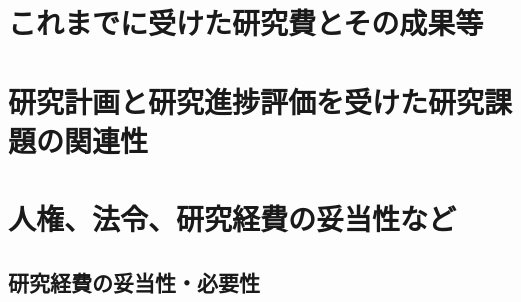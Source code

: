 \documentclass[11pt,a4paper,twoside]{jarticle}
\newcommand{\研究種別}{A}	%
\newcommand{\研究課題名}{コ・クリエイティブなソフトウェア開発者を育成するPBL型教育}
\newcommand{\研究機関名}{産業技術大学院大学}
\newcommand{\研究代表者氏名}{中鉢　欣秀}
\newcommand{\研究代表者氏名ふりがな}{ちゅうばち　よしひで}
\newcommand{\本応募effort}{\KLEffort{18}}	%
\newcommand{\研究期間の最終元号年度}{27}	%
\begin{document}
\section{これまでに受けた研究費とその成果等}
\newcommand{\これまでに受けた研究費とその成果等}{%
	\begin{itemize}
		\item 若手研究(B) ，2008～2009年度，
		    「情報システムアーキテクト育成のための遠隔教育システム」，研究代表者，3,900千円\\
		    本研究では社会人教育における利用を想定したモデリング遠隔教育支援シス
            テムを研究開発した．これを用いて，特にユーザ企業の社会人を対象としたモデリング
            教育支援環境を構築し，その有用性を確かめることができた．
    \end{itemize}
}

\section{研究計画と研究進捗評価を受けた研究課題の関連性}
\newcommand{\研究計画と研究進捗評価を受けた研究課題の関連性}{%
	特になし．
}

\section{人権、法令、研究経費の妥当性など}
\newcommand{\人権の保護及び法令等の遵守への対応}{%
	特になし．
}

\subsection{研究経費の妥当性・必要性}
\newcommand{\研究経費の妥当性と必要性}{%
	「研究計画・方法」欄で述べた研究規模、研究体制等を踏まえると、
	次頁以降に記入する研究費は妥当、かつ必要であり、
	積算根拠も妥当である。
}
\end{document}
